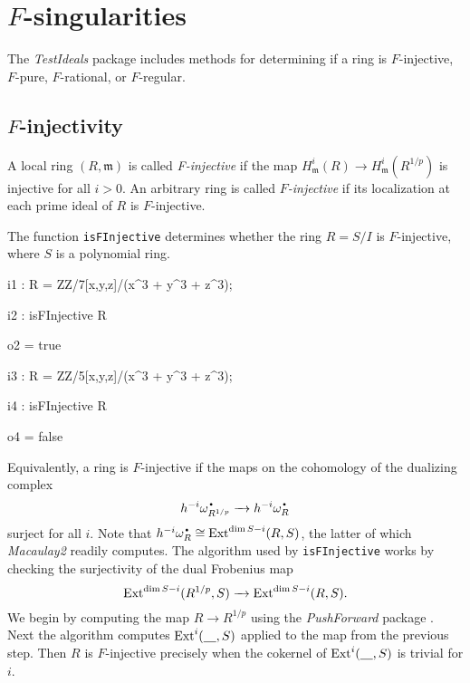 \documentclass{amsart}
\begin{document}
\section{$F$-singularities}\label{Section: F-singularities}

The \emph{TestIdeals} package includes methods for determining if a ring is $F$-injective, $F$-pure, $F$-rational, or $F$-regular.

\subsection{$F$-injectivity}

\begin{definition}
A local ring $(R, \mathfrak{m})$ is called \emph{F-injective} if the map
$H^{i}_{\mathfrak{m}}(R) \rightarrow H^{i}_{\mathfrak{m}}(R^{1/p})$ is
injective for all $i >0$. An arbitrary ring is called \emph{$F$-injective} if its
localization at each prime ideal of $R$ is $F$-injective.
\end{definition}

The function \texttt{isFInjective} determines whether the ring $R = S/I$ is
$F$-injective, where $S$ is a polynomial ring.

\medskip
{\small{}
\begin{MyVerbatim}
i1 : R = ZZ/7[x,y,z]/(x^3 + y^3 + z^3);

i2 : isFInjective R

o2 = true

i3 : R = ZZ/5[x,y,z]/(x^3 + y^3 + z^3);

i4 : isFInjective R

o4 = false
\end{MyVerbatim}
}\medskip

Equivalently, a ring is $F$-injective if the maps on the cohomology of the dualizing complex
\[
h^{-i} \omega_{R^{1/p}}^{\mydot} \to h^{-i} \omega_R^{\mydot}
\]
surject for all $i$.
Note that $h^{-i} \omega_R^{\mydot} \cong \Ext^{\dim S - i}(R, S)$, the latter of which \emph{Macaulay2} readily computes.
The algorithm used by \texttt{isFInjective} works by checking the surjectivity of the dual Frobenius map
\[
\operatorname{Ext}^{\dim S - i}(R^{1/p}, S) \xrightarrow{\ \ } \operatorname{Ext}^{\dim S - i}(R, S).
\]
We begin by computing the map $R
\rightarrow R^{1/p}$ using the \emph{PushForward} package \cite{PushForward}.
Next the algorithm computes
$\operatorname{Ext}^{i}( \underline{\hskip 10pt}, S)$ applied to the map from the previous step.  Then $R$ is $F$-injective precisely when the
cokernel of $\operatorname{Ext}^{i}( \underline{\hskip 10pt}, S)$ is trivial for $i$.
\end{document}
